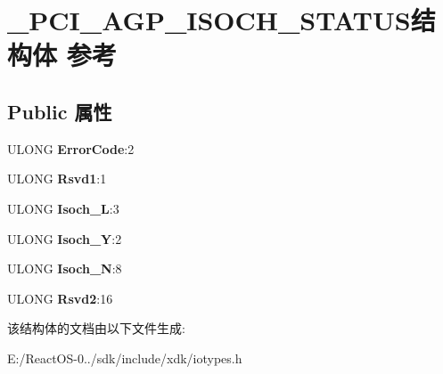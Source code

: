 \hypertarget{struct___p_c_i___a_g_p___i_s_o_c_h___s_t_a_t_u_s}{}\section{\+\_\+\+P\+C\+I\+\_\+\+A\+G\+P\+\_\+\+I\+S\+O\+C\+H\+\_\+\+S\+T\+A\+T\+U\+S结构体 参考}
\label{struct___p_c_i___a_g_p___i_s_o_c_h___s_t_a_t_u_s}
\subsection*{Public 属性}
\begin{DoxyCompactItemize}
\item 
\mbox{\label{struct___p_c_i___a_g_p___i_s_o_c_h___s_t_a_t_u_s_a09a8f24004d54c62c3c8eee7bcaac856}} 
U\+L\+O\+NG {\bfseries Error\+Code}\+:2
\item 
\mbox{\label{struct___p_c_i___a_g_p___i_s_o_c_h___s_t_a_t_u_s_a7d2457b02cc516bc341e49d2392c26a1}} 
U\+L\+O\+NG {\bfseries Rsvd1}\+:1
\item 
\mbox{\label{struct___p_c_i___a_g_p___i_s_o_c_h___s_t_a_t_u_s_a054e41ace75abf28b0b948aa831ae5a8}} 
U\+L\+O\+NG {\bfseries Isoch\+\_\+L}\+:3
\item 
\mbox{\label{struct___p_c_i___a_g_p___i_s_o_c_h___s_t_a_t_u_s_a5d7c9d2cdedd77f65a2920df89c47bbb}} 
U\+L\+O\+NG {\bfseries Isoch\+\_\+Y}\+:2
\item 
\mbox{\label{struct___p_c_i___a_g_p___i_s_o_c_h___s_t_a_t_u_s_ad3047e034ddfc39006c051e07b87f58c}} 
U\+L\+O\+NG {\bfseries Isoch\+\_\+N}\+:8
\item 
\mbox{\label{struct___p_c_i___a_g_p___i_s_o_c_h___s_t_a_t_u_s_a51e000326a1e838b48748fb653fa57a7}} 
U\+L\+O\+NG {\bfseries Rsvd2}\+:16
\end{DoxyCompactItemize}


该结构体的文档由以下文件生成\+:\begin{DoxyCompactItemize}
\item 
E\+:/\+React\+O\+S-\/0../sdk/include/xdk/iotypes.\+h\end{DoxyCompactItemize}
